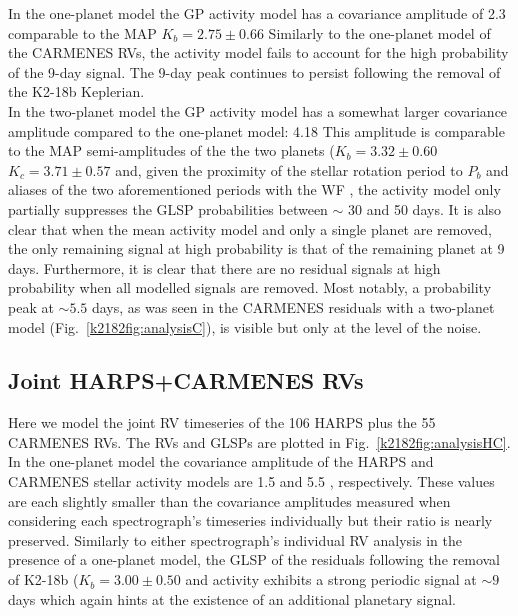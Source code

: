 In the one-planet model the GP activity model has a covariance amplitude of 2.3 \mps{,} comparable to the
MAP $K_b=2.75\pm 0.66$ 
Similarly to the one-planet model of the CARMENES RVs, the activity model fails to account for
the high probability of the 9-day signal. The 9-day peak continues to persist following the removal of
the K2-18b Keplerian.  \\

In the two-planet model the GP activity model has a somewhat larger covariance amplitude compared to
the one-planet model: 4.18  This amplitude is comparable to the MAP semi-amplitudes of the
the two planets ($K_b=3.32\pm 0.60$ \mps{,} $K_c=3.71\pm 0.57$ \mps{)} and,
given the proximity of the stellar rotation period to $P_b$ and aliases of the two aforementioned periods with
the WF , the activity model only partially suppresses the GLSP probabilities between
$\sim$ 30 and 50 days. It is also clear that when the mean activity model and only a single planet are
removed, the only remaining signal at high probability is that of the remaining planet at 9 days. Furthermore, it
is clear that there are no residual signals at high probability when all modelled signals are removed. 
Most notably, a probability peak at $\sim 5.5$ days, as was seen in the CARMENES residuals with a
two-planet model (Fig.~\ref{k2182fig:analysisC}), is visible but only at the level of the noise.


\subsection{Joint HARPS+CARMENES RVs}
Here we model the joint RV timeseries of the 106 HARPS plus the 55 CARMENES RVs.
The RVs and GLSPs are plotted in Fig.~\ref{k2182fig:analysisHC}. In the one-planet model the
covariance amplitude of the HARPS and CARMENES stellar activity models are 1.5 and 5.5 \mps{}, respectively.
These values are each slightly smaller than the covariance amplitudes measured when considering each
spectrograph's timeseries individually but their ratio is nearly preserved.
Similarly to either spectrograph's individual RV analysis in the presence of a one-planet
model, the GLSP of the residuals following the removal of K2-18b ($K_b=3.00\pm 0.50$ \mps{)}
and activity exhibits a strong periodic signal
at $\sim 9$ days which again hints at the existence of an additional planetary signal. \\

